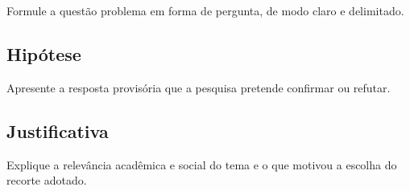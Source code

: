 Formule a questão problema em forma de pergunta, de modo claro e delimitado.

\subsection{Hipótese}

Apresente a resposta provisória que a pesquisa pretende confirmar ou refutar.

\subsection{Justificativa}

Explique a relevância acadêmica e social do tema e o que motivou a escolha do
recorte adotado.

